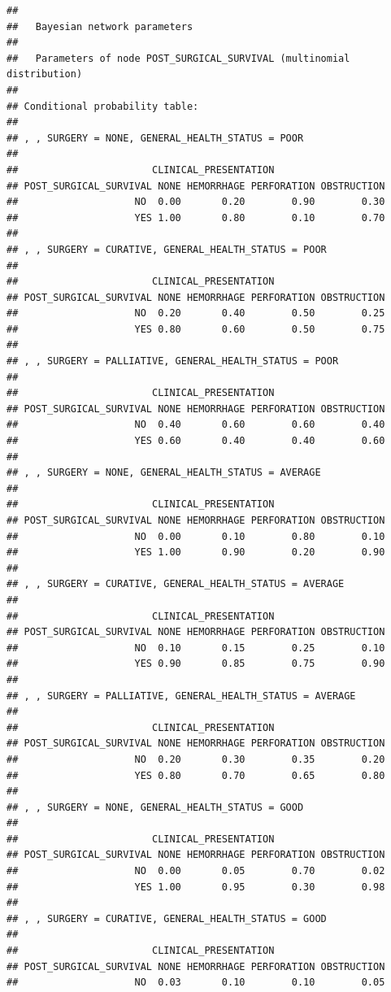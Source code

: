 \documentclass[]{article}
\begin{document}
\begin{verbatim}
## 
##   Bayesian network parameters
## 
##   Parameters of node POST_SURGICAL_SURVIVAL (multinomial distribution)
## 
## Conditional probability table:
##  
## , , SURGERY = NONE, GENERAL_HEALTH_STATUS = POOR
## 
##                       CLINICAL_PRESENTATION
## POST_SURGICAL_SURVIVAL NONE HEMORRHAGE PERFORATION OBSTRUCTION
##                    NO  0.00       0.20        0.90        0.30
##                    YES 1.00       0.80        0.10        0.70
## 
## , , SURGERY = CURATIVE, GENERAL_HEALTH_STATUS = POOR
## 
##                       CLINICAL_PRESENTATION
## POST_SURGICAL_SURVIVAL NONE HEMORRHAGE PERFORATION OBSTRUCTION
##                    NO  0.20       0.40        0.50        0.25
##                    YES 0.80       0.60        0.50        0.75
## 
## , , SURGERY = PALLIATIVE, GENERAL_HEALTH_STATUS = POOR
## 
##                       CLINICAL_PRESENTATION
## POST_SURGICAL_SURVIVAL NONE HEMORRHAGE PERFORATION OBSTRUCTION
##                    NO  0.40       0.60        0.60        0.40
##                    YES 0.60       0.40        0.40        0.60
## 
## , , SURGERY = NONE, GENERAL_HEALTH_STATUS = AVERAGE
## 
##                       CLINICAL_PRESENTATION
## POST_SURGICAL_SURVIVAL NONE HEMORRHAGE PERFORATION OBSTRUCTION
##                    NO  0.00       0.10        0.80        0.10
##                    YES 1.00       0.90        0.20        0.90
## 
## , , SURGERY = CURATIVE, GENERAL_HEALTH_STATUS = AVERAGE
## 
##                       CLINICAL_PRESENTATION
## POST_SURGICAL_SURVIVAL NONE HEMORRHAGE PERFORATION OBSTRUCTION
##                    NO  0.10       0.15        0.25        0.10
##                    YES 0.90       0.85        0.75        0.90
## 
## , , SURGERY = PALLIATIVE, GENERAL_HEALTH_STATUS = AVERAGE
## 
##                       CLINICAL_PRESENTATION
## POST_SURGICAL_SURVIVAL NONE HEMORRHAGE PERFORATION OBSTRUCTION
##                    NO  0.20       0.30        0.35        0.20
##                    YES 0.80       0.70        0.65        0.80
## 
## , , SURGERY = NONE, GENERAL_HEALTH_STATUS = GOOD
## 
##                       CLINICAL_PRESENTATION
## POST_SURGICAL_SURVIVAL NONE HEMORRHAGE PERFORATION OBSTRUCTION
##                    NO  0.00       0.05        0.70        0.02
##                    YES 1.00       0.95        0.30        0.98
## 
## , , SURGERY = CURATIVE, GENERAL_HEALTH_STATUS = GOOD
## 
##                       CLINICAL_PRESENTATION
## POST_SURGICAL_SURVIVAL NONE HEMORRHAGE PERFORATION OBSTRUCTION
##                    NO  0.03       0.10        0.10        0.05

\end{verbatim}
\end{document}
